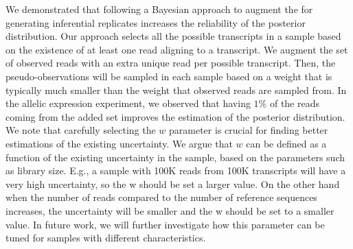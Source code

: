 We demonstrated that following a Bayesian approach to augment the \boots for generating
inferential replicates increases the reliability of the posterior distribution.
Our approach selects all the possible transcripts in a sample based on the existence of at least
one read aligning to a transcript. We augment the set of observed
reads with an extra unique read per possible transcript. Then, the pseudo-observations will be
sampled in each \boot sample based on a weight that is typically much smaller than the weight that
observed reads are sampled from. 
In the allelic expression experiment, we observed that having $1\%$
of the reads coming from the added set improves the estimation of the posterior distribution.
We note that carefully selecting the $w$ parameter is crucial for finding better estimations of 
the existing uncertainty. We argue that $w$ can be defined as a function of the existing uncertainty
in the sample, based on the parameters such as library size. E.g., a sample with 100K reads from 100K
transcripts will have a very high uncertainty, so the w should be set a larger value. On the other hand
when the number of reads compared to the number of reference sequences increases, the uncertainty will
be smaller and the w should be set to a smaller value. In future work, we will further investigate 
how this parameter can be tuned for samples with different characteristics.


